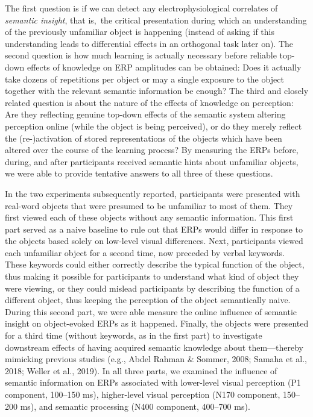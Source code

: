 \documentclass[
  english,
  doc,12pt,twoside,floatsintext]{apa7}
\begin{document}
The first question is if we can detect any electrophysiological correlates of \emph{semantic insight}, that is,~the critical presentation during which an understanding of the previously unfamiliar object is happening (instead of asking if this understanding leads to differential effects in an orthogonal task later on). The second question is how much learning is actually necessary before reliable top-down effects of knowledge on ERP amplitudes can be obtained: Does it actually take dozens of repetitions per object or may a single exposure to the object together with the relevant semantic information be enough? The third and closely related question is about the nature of the effects of knowledge on perception: Are they reflecting genuine top-down effects of the semantic system altering perception online (while the object is being perceived), or do they merely reflect the (re-)activation of stored representations of the objects which have been altered over the course of the learning process? By measuring the ERPs before, during, and after participants received semantic hints about unfamiliar objects, we were able to provide tentative answers to all three of these questions.

In the two experiments subsequently reported, participants were presented with real-word objects that were presumed to be unfamiliar to most of them. They first viewed each of these objects without any semantic information. This first part served as a naive baseline to rule out that ERPs would differ in response to the objects based solely on low-level visual differences. Next, participants viewed each unfamiliar object for a second time, now preceded by verbal keywords. These keywords could either correctly describe the typical function of the object, thus making it possible for participants to understand what kind of object they were viewing, or they could mislead participants by describing the function of a different object, thus keeping the perception of the object semantically naive. During this second part, we were able measure the online influence of semantic insight on object-evoked ERPs as it happened. Finally, the objects were presented for a third time (without keywords, as in the first part) to investigate downstream effects of having acquired semantic knowledge about them---thereby mimicking previous studies (e.g., Abdel Rahman \& Sommer, 2008; Samaha et al., 2018; Weller et al., 2019). In all three parts, we examined the influence of semantic information on ERPs associated with lower-level visual perception (P1 component, 100--150 ms), higher-level visual perception (N170 component, 150--200 ms), and semantic processing (N400 component, 400--700 ms).
\end{document}
